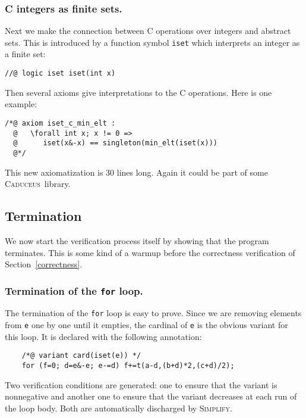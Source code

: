 \documentclass[a4paper]{llncs}
\newcommand{\caduceus}{\textsc{Caduceus}}
\newcommand{\simplify}{\textsc{Simplify}}
\begin{document}
\subsubsection{C integers as finite sets.}
Next we make the connection between C operations over integers and
abstract sets. This is introduced by a function symbol \texttt{iset}
which interprets an integer as a finite set:
\begin{verbatim}
//@ logic iset iset(int x)
\end{verbatim}
Then several axioms give interpretations to the C operations.
Here is one example:
\begin{verbatim}
/*@ axiom iset_c_min_elt :
  @   \forall int x; x != 0 =>
  @      iset(x&-x) == singleton(min_elt(iset(x)))
  @*/
\end{verbatim}
This new axiomatization is 30 lines long. Again it could be part of some
\caduceus\ library.

\subsection{Termination}

We now start the verification process itself by showing that the
program terminates. This is some kind of a warmup before the
correctness verification of Section~\ref{correctness}.

\subsubsection{Termination of the \texttt{for} loop.}
The termination of the \texttt{for} loop is easy to prove.
Since we are removing elements from \texttt{e} one by one until it
empties, the cardinal of \texttt{e} is the obvious variant for this
loop. It is declared with the following annotation:
\begin{verbatim}
    /*@ variant card(iset(e)) */
    for (f=0; d=e&-e; e-=d) f+=t(a-d,(b+d)*2,(c+d)/2);
\end{verbatim}
Two verification conditions are generated: one to ensure that the
variant is nonnegative and another one to ensure that the variant
decreases at each run of the loop body. Both are automatically
discharged by \simplify.
\end{document}
